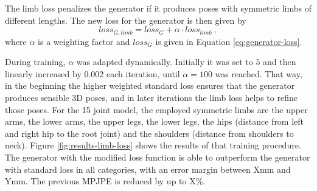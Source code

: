 The limb loss penalizes the generator if it produces poses with symmetric limbs of different lengths.
The new loss for the generator is then given by
\begin{equation}
	loss_{G, limb} = loss_G + \alpha \cdot loss_{limb} \ ,
\end{equation}
where $\alpha$ is a weighting factor and $loss_G$ is given in Equation \eqref{eq:generator-loss}.



During training, $\alpha$ was adapted dynamically.
Initially it was set to $5$ and then linearly increased by $0.002$ each iteration, until $\alpha = 100$ was reached.
That way, in the beginning the higher weighted standard loss ensures that the generator produces sensible 3D poses, and in later iterations the limb loss helps to refine those poses.
For the 15 joint model, the employed symmetric limbs are the upper arms, the lower arms, the upper legs, the lower legs, the hips (distance from left and right hip to the root joint) and the shoulders (distance from shoulders to neck). 
Figure \ref{fig:results-limb-loss} shows the results of that training procedure.
The generator with the modified loss function is able to outperform the generator with standard loss in all categories, with an error margin between Xmm and Ymm.
The previous MPJPE is reduced by up to X\%.


